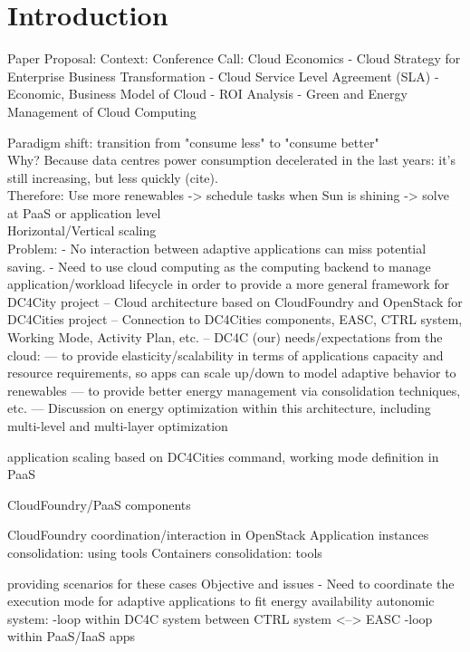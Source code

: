 \section{Introduction}
\label{sec: intro}
Paper Proposal:
Context:
  Conference Call: Cloud Economics
- Cloud Strategy for Enterprise Business Transformation
- Cloud Service Level Agreement (SLA)
- Economic, Business Model of Cloud
- ROI Analysis
- Green and Energy Management of Cloud Computing

Paradigm shift: transition from "consume less" to "consume better" \\
Why? Because data centres power consumption decelerated in the last years: it's still increasing, but less quickly (cite). \\

Therefore: Use more renewables -> schedule tasks when Sun is shining -> solve at PaaS or application level \\
Horizontal/Vertical scaling \\

Problem:
- No interaction between adaptive applications can miss potential saving.
- Need to use cloud computing as the computing backend to manage application/workload lifecycle in order to provide a more general framework for DC4City project
-- Cloud architecture based on CloudFoundry and OpenStack for DC4Cities project
-- Connection to DC4Cities components, EASC, CTRL system, Working Mode, Activity Plan, etc.
-- DC4C (our) needs/expectations from the cloud:
--- to provide elasticity/scalability in terms of applications capacity and resource requirements, so apps can scale up/down to model adaptive behavior to renewables
--- to provide better energy management via consolidation techniques, etc.
--- Discussion on energy optimization within this architecture, including multi-level and multi-layer optimization


application scaling based on DC4Cities command,
working mode definition in PaaS

CloudFoundry/PaaS components

CloudFoundry coordination/interaction in OpenStack
Application instances consolidation: using tools
Containers consolidation: tools


providing scenarios for these cases
Objective and issues
- Need to coordinate the execution mode for adaptive applications to fit energy availability
autonomic system:
-loop within DC4C system between CTRL system <--> EASC
-loop within PaaS/IaaS apps
		
